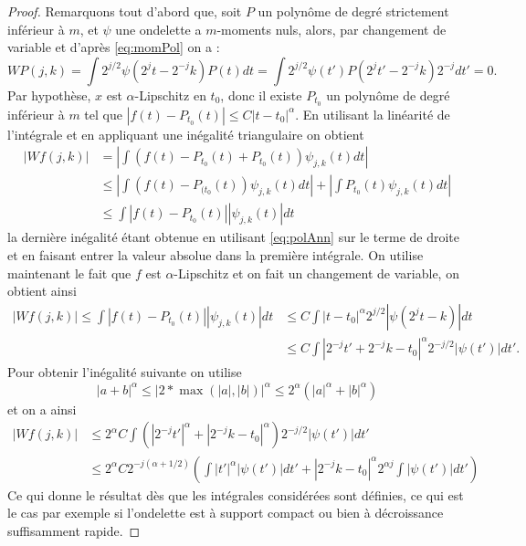 \begin{proof}
	Remarquons tout d'abord que, soit $P$ un polynôme de degré strictement inférieur à $m$, et $\psi$ une ondelette a $m$-moments nuls, alors, par changement de variable et d'après \ref{eq:momPol} on a :
	\begin{equation}\label{eq:polAnn}
		WP(j, k) = \int 2^{j/2} \psi(2^jt - 2^{-j}k) P(t)dt 
		= \int 2^{j/2}\psi(t')P(2^jt' - 2^{-j} k) 2^{-j} dt' = 0.
	\end{equation}
	Par hypothèse, $x$ est $\alpha$-Lipschitz en $t_0$, donc il existe $P_{t_0}$ un polynôme de degré inférieur à $m$ tel que $|f(t) - P_{t_0}(t)| \leq C|t - t_0|^{\alpha}$.
	En utilisant la linéarité de l'intégrale et en appliquant une inégalité triangulaire on obtient
	\begin{align*}
		|Wf(j,k)| &= \left|\int (f(t) -P_{t_0}(t) + P_{t_0}(t)) \psi_{j, k}(t) dt\right| \\
			&\leq \left|\int (f(t) - P_{(t_0}(t)) \psi_{j,k}(t)dt\right| + \left|\int P_{t_0}(t) \psi_{j,k}(t)dt\right| \\ 
			&\leq \int| f(t) - P_{t_0}(t)| |\psi_{j,k}(t)|dt  
	\end{align*}
	la dernière inégalité étant obtenue en utilisant \ref{eq:polAnn} sur le terme de droite et en faisant entrer la valeur absolue dans la première intégrale.
	On utilise maintenant le fait que $f$ est $\alpha$-Lipschitz et on fait un changement de variable, on obtient ainsi
	\begin{align*}
		| Wf(j,k)| \leq \int |f(t) - P_{t_0}(t)||\psi_{j,k}(t)|dt &\leq C\int |t - t_0|^\alpha 2^{j/2} |\psi(2^jt - k)|dt \\
		&\leq C \int |2^{-j} t' + 2^{-j}k - t_0|^\alpha 2^{-j/2} |\psi(t')| dt'. 
	\end{align*}
	Pour obtenir l'inégalité suivante on utilise
	\begin{equation*}
		|a + b|^\alpha \leq |2*\max(|a|, |b|)|^\alpha \leq 2^\alpha (|a|^\alpha + |b|^\alpha)
	\end{equation*}
	et on a ainsi
	\begin{align*}
		|Wf(j,k)| &\leq 2^\alpha C \int (|2^{-j}t'|^\alpha + |2^{-j}k-t_0|^\alpha)2^{-j/2} |\psi(t')|dt'\\
		&\leq 2^\alpha C 2^{-j(\alpha + 1/2)}\left( \int|t'|^\alpha |\psi(t')|dt' + |2^{-j}k-t_0|^\alpha 2^{\alpha j}\int |\psi(t')|dt' \right)
	\end{align*}
	Ce qui donne le résultat dès que les intégrales considérées sont définies, ce qui est le cas par exemple si l'ondelette est à support compact ou bien à décroissance suffisamment rapide. 
\end{proof}
